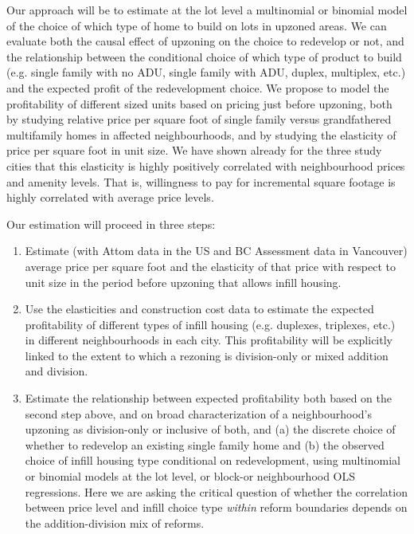 \documentclass[12pt]{article}
\begin{document}
Our approach will be to estimate at the lot level a multinomial or binomial model of the choice of which type of home to build on lots in upzoned areas. We can evaluate both the causal effect of upzoning on the choice to redevelop or not, and the relationship between the conditional choice of which type of product to build (e.g. single family with no ADU, single family with ADU, duplex, multiplex, etc.) and the expected profit of the redevelopment choice. We propose to model the profitability of different sized units based on pricing just before upzoning, both by studying relative price per square foot of single family versus grandfathered multifamily homes in affected neighbourhoods, and by studying the elasticity of price per square foot in unit size. We have shown already for the three study cities that this elasticity is highly positively correlated with neighbourhood prices and amenity levels. That is, willingness to pay for incremental square footage is highly correlated with average price levels.

Our estimation will proceed in three steps:

\begin{enumerate}
	\item Estimate (with Attom data in the US and BC Assessment data in Vancouver) average price per square foot and the elasticity of that price with respect to unit size in the period before upzoning that allows infill housing. 
	\item Use the elasticities and construction cost data to estimate the expected profitability of different types of infill housing (e.g. duplexes, triplexes, etc.) in different neighbourhoods in each city. This profitability will be explicitly linked to the extent to which a rezoning is division-only or mixed addition and division.
	\item Estimate the relationship between expected profitability both based on the second step above, and on broad characterization of a neighbourhood's upzoning as division-only or inclusive of both, and (a) the discrete choice of whether to redevelop an existing single family home and (b) the observed choice of infill housing type conditional on redevelopment, using multinomial or binomial models at the lot level, or block-or neighbourhood OLS regressions. Here we are asking the critical question of whether the correlation between price level and infill choice type \emph{within} reform boundaries depends on the addition-division mix of reforms.
\end{enumerate}
\end{document}
